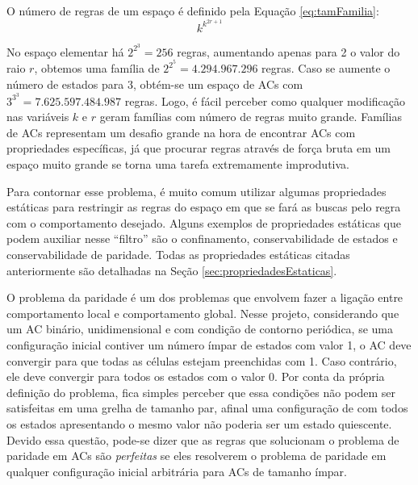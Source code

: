 \documentclass[12pt,a4paper]{article}
\begin{document}
O número de regras de um espaço é definido pela Equação \ref{eq:tamFamilia}:
\begin{equation}
k^{k^{2r+1}}
\label{eq:tamFamilia}
\end{equation}

No espaço elementar há $2^{2^{3}} = 256$ regras, aumentando apenas para 2 o valor do raio $r$, obtemos uma família de $2^{2^{5}} = 4.294.967.296$ regras. Caso se aumente o número de estados para 3, obtém-se um espaço de ACs com $3^{3^{3}} = 7.625.597.484.987$ regras. Logo, é fácil perceber como qualquer modificação nas variáveis $k$ e $r$ geram famílias com número de regras muito grande. Famílias de ACs representam um desafio grande na hora de encontrar ACs com propriedades específicas, já que procurar regras através de força bruta em um espaço muito grande se torna uma tarefa extremamente improdutiva.

Para contornar esse problema, é muito comum utilizar algumas propriedades estáticas para restringir as regras do espaço em que se fará as buscas pelo regra com o comportamento desejado. Alguns exemplos de propriedades estáticas que podem auxiliar nesse ``filtro'' são o confinamento, conservabilidade de estados e conservabilidade de paridade. Todas as propriedades estáticas citadas anteriormente são detalhadas na Seção \ref{sec:propriedadesEstaticas}.

O problema da paridade é um dos problemas que envolvem fazer a ligação entre comportamento local e comportamento global. Nesse projeto, considerando que um AC binário, unidimensional e com condição de contorno periódica, se uma configuração inicial contiver um número ímpar de estados com valor 1, o AC deve convergir para que todas as células estejam preenchidas com 1. Caso contrário, ele deve convergir para todos os estados com o valor 0. Por conta da própria definição do problema, fica simples perceber que essa condições não podem ser satisfeitas em uma grelha de tamanho par, afinal uma configuração de com todos os estados apresentando o mesmo valor não poderia ser um estado quiescente. Devido essa questão, pode-se dizer que as regras que solucionam o problema de paridade em ACs são \textit{perfeitas} se eles resolverem o problema de paridade em qualquer configuração inicial arbitrária para ACs de tamanho ímpar. 
\end{document}
